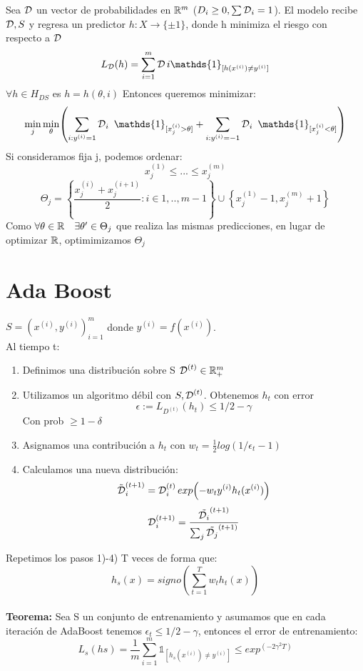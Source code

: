 \documentclass[11pt,reqno,twoside]{article}
\begin{document}
Sea $\operatorname{\mathcal{D}}$ un vector de probabilidades en $\mathbb{R}^m$ ($D_i \geq 0, \sum \operatorname{\mathcal{D}}_i=1$). El modelo recibe $\operatorname{\mathcal{D}}, S$ y regresa un predictor $h:X \rightarrow\{\pm 1\}$, donde h minimiza el riesgo con respecto a $\operatorname{\mathcal{D}}$
\[L_{\D}(h)=\sum_{i=1}^{m} \D i \mathds{1}_{[h(x^{(i)}) \neq y^{(i)} ]}\]
$\forall h\in H_{DS}$ es $h=h(\theta,i)$ Entonces queremos minimizar:
\[\min_j \min_{\theta} \left( \sum_{i:y^{(i)}=1} \D_i \ \mathds{1}_{[x_j^{(i)}>\theta]}  + \sum_{i: y^{(i)}=-1} \D_i \ \mathds{1}_{[x_j^{(i)}<\theta]}\right)\]
Si consideramos fija j, podemos ordenar:
\[x_j^{(1)} \leq ... \leq x_j^{(m)}\]
\[\Theta_j = \left \{ \frac{x_j^{(i)}+x_j^{(i+1)}}{2}: i \in {1,..,m-1} \right \} \cup \left \{ x_j^{(1)}-1 , x_j^{(m)}+1 \right\}\]
Como $\forall \theta \in \mathbb{R} \quad \exists \theta ' \in \Theta_j$ que realiza las mismas predicciones, en lugar de optimizar $\mathbb{R}$, optimimizamos $\Theta_j$

\section{Ada Boost}
$S={(x^{(i)}, y^{(i)})}_{i=1}^{m}$ donde $y^{(i)}=f(x^{(i)})$.\\
Al tiempo t:
\begin{enumerate}
    \item Definimos una distribución sobre S $\operatorname{\mathcal{D}}^{(t)} \in \mathbb{R}^{m}_+$
    \item Utilizamos un algoritmo débil con $S, \operatorname{\mathcal{D}}^{(t)}$. Obtenemos $h_t$ con error
    \[\epsilon := L_{D^{(t)}} (h_t) \leq 1/2 -\gamma\]
    Con prob $\geq 1- \delta$
    \item Asignamos una contribución a $h_t$ con $w_t= \frac{1}{2} log (1/\epsilon_t -1)$
    \item Calculamos una nueva distribución:
    \[\Tilde{\D}_i ^{(t+1)}= \D^{(t)}_i exp \left(-w_ty^{(i)}h_t(x^{(i)})\right)\]
    \[\operatorname{\mathcal{D}}_i^{(t+1)}= \frac{\Tilde{\operatorname{\mathcal{D}}_i}^{(t+1)}}{\sum_j \Tilde{\operatorname{\mathcal{D}}_j }^{(t+1)}}\]
\end{enumerate}
Repetimos los pasos 1)-4) T veces de forma que:
\[h_s(x)= signo\left( \sum_{t=1}^T w_t h_t(x)\right) \]
\\
\textbf{Teorema:} Sea S un conjunto de entrenamiento y asumamos que en cada iteración de AdaBoost tenemos $\epsilon_t \leq 1/2-\gamma$, entonces el error de entrenamiento:
\[L_s(hs)= \frac{1}{m} \sum_{i=1}^m \mathds{1}_{[h_s(x^{(i)})\neq y^{(i)}]} \leq exp^{(-2\gamma^2T)}\]
\end{document}
